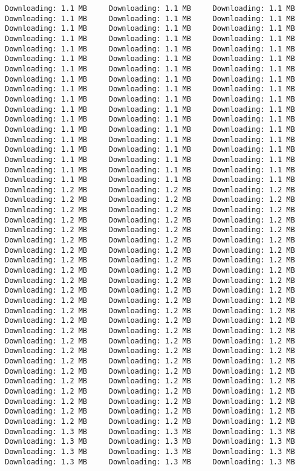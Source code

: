\documentclass[
  12pt,
]{report}
\begin{document}
\begin{verbatim}
Downloading: 1.1 MB     Downloading: 1.1 MB     Downloading: 1.1 MB     Downloading: 1.1 MB     Downloading: 1.1 MB     Downloading: 1.1 MB     Downloading: 1.1 MB     Downloading: 1.1 MB     Downloading: 1.1 MB     Downloading: 1.1 MB     Downloading: 1.1 MB     Downloading: 1.1 MB     Downloading: 1.1 MB     Downloading: 1.1 MB     Downloading: 1.1 MB     Downloading: 1.1 MB     Downloading: 1.1 MB     Downloading: 1.1 MB     Downloading: 1.1 MB     Downloading: 1.1 MB     Downloading: 1.1 MB     Downloading: 1.1 MB     Downloading: 1.1 MB     Downloading: 1.1 MB     Downloading: 1.1 MB     Downloading: 1.1 MB     Downloading: 1.1 MB     Downloading: 1.1 MB     Downloading: 1.1 MB     Downloading: 1.1 MB     Downloading: 1.1 MB     Downloading: 1.1 MB     Downloading: 1.1 MB     Downloading: 1.1 MB     Downloading: 1.1 MB     Downloading: 1.1 MB     Downloading: 1.1 MB     Downloading: 1.1 MB     Downloading: 1.1 MB     Downloading: 1.1 MB     Downloading: 1.1 MB     Downloading: 1.1 MB     Downloading: 1.1 MB     Downloading: 1.1 MB     Downloading: 1.1 MB     Downloading: 1.1 MB     Downloading: 1.1 MB     Downloading: 1.1 MB     Downloading: 1.1 MB     Downloading: 1.1 MB     Downloading: 1.1 MB     Downloading: 1.1 MB     Downloading: 1.1 MB     Downloading: 1.1 MB     Downloading: 1.2 MB     Downloading: 1.2 MB     Downloading: 1.2 MB     Downloading: 1.2 MB     Downloading: 1.2 MB     Downloading: 1.2 MB     Downloading: 1.2 MB     Downloading: 1.2 MB     Downloading: 1.2 MB     Downloading: 1.2 MB     Downloading: 1.2 MB     Downloading: 1.2 MB     Downloading: 1.2 MB     Downloading: 1.2 MB     Downloading: 1.2 MB     Downloading: 1.2 MB     Downloading: 1.2 MB     Downloading: 1.2 MB     Downloading: 1.2 MB     Downloading: 1.2 MB     Downloading: 1.2 MB     Downloading: 1.2 MB     Downloading: 1.2 MB     Downloading: 1.2 MB     Downloading: 1.2 MB     Downloading: 1.2 MB     Downloading: 1.2 MB     Downloading: 1.2 MB     Downloading: 1.2 MB     Downloading: 1.2 MB     Downloading: 1.2 MB     Downloading: 1.2 MB     Downloading: 1.2 MB     Downloading: 1.2 MB     Downloading: 1.2 MB     Downloading: 1.2 MB     Downloading: 1.2 MB     Downloading: 1.2 MB     Downloading: 1.2 MB     Downloading: 1.2 MB     Downloading: 1.2 MB     Downloading: 1.2 MB     Downloading: 1.2 MB     Downloading: 1.2 MB     Downloading: 1.2 MB     Downloading: 1.2 MB     Downloading: 1.2 MB     Downloading: 1.2 MB     Downloading: 1.2 MB     Downloading: 1.2 MB     Downloading: 1.2 MB     Downloading: 1.2 MB     Downloading: 1.2 MB     Downloading: 1.2 MB     Downloading: 1.2 MB     Downloading: 1.2 MB     Downloading: 1.2 MB     Downloading: 1.2 MB     Downloading: 1.2 MB     Downloading: 1.2 MB     Downloading: 1.2 MB     Downloading: 1.2 MB     Downloading: 1.2 MB     Downloading: 1.2 MB     Downloading: 1.2 MB     Downloading: 1.2 MB     Downloading: 1.2 MB     Downloading: 1.2 MB     Downloading: 1.2 MB     Downloading: 1.2 MB     Downloading: 1.2 MB     Downloading: 1.2 MB     Downloading: 1.3 MB     Downloading: 1.3 MB     Downloading: 1.3 MB     Downloading: 1.3 MB     Downloading: 1.3 MB     Downloading: 1.3 MB     Downloading: 1.3 MB     Downloading: 1.3 MB     Downloading: 1.3 MB     Downloading: 1.3 MB     Downloading: 1.3 MB     Downloading: 1.3 MB     
\end{verbatim}
\end{document}
